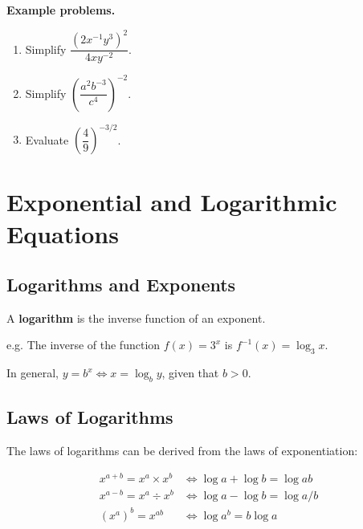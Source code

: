 \textbf{Example problems.}
\begin{enumerate}
    \item Simplify $\dfrac{(2x^{-1}y^3)^2}{4xy^{-2}}$.
    \item Simplify $\left(\dfrac{a^2b^{-3}}{c^4}\right)^{-2}$.
    \item Evaluate $\left(\dfrac{4}{9}\right)^{-3/2}$.
\end{enumerate}



\section{Exponential and Logarithmic Equations}
\label{sec:expo-5171}



\subsection{Logarithms and Exponents}
\label{sss:loga-bda9}




A \textbf{logarithm} is the inverse function of an exponent.



e.g. The inverse of the function $f(x) = 3^x$ is $f^{-1}(x) = \log _3 x$.



In general, $y = b^x \iff x = \log _b y$, given that $b > 0$.




\subsection{Laws of Logarithms}
\label{sss:laws-71f5}




The laws of logarithms can be derived from the laws of exponentiation:



\begin{align} x^{a+b} = x^a \times x^b & \iff \log a + \log b = \log ab \\ x^{a-b} = x^a \div x^b & \iff \log a - \log b = \log a/b \\ (x^a)^b = x^{ab} & \iff \log a^b = b \log a \end{align}



